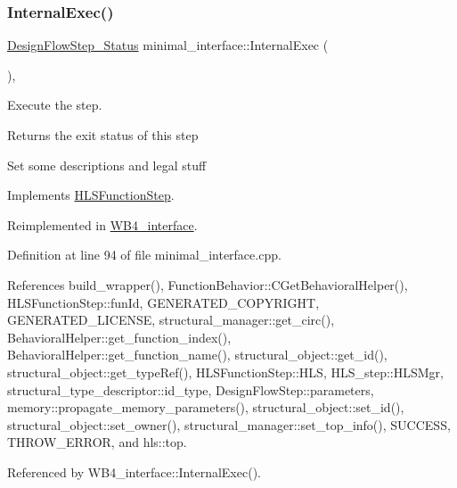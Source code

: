 \subsubsection{\texorpdfstring{Internal\+Exec()}{InternalExec()}}
{\footnotesize\ttfamily \hyperlink{design__flow__step_8hpp_afb1f0d73069c26076b8d31dbc8ebecdf}{Design\+Flow\+Step\+\_\+\+Status} minimal\+\_\+interface\+::\+Internal\+Exec (\begin{DoxyParamCaption}{ }\end{DoxyParamCaption})\hspace{0.3cm}{\ttfamily [override]}, {\ttfamily [virtual]}}



Execute the step. 

\begin{DoxyReturn}{Returns}
the exit status of this step 
\end{DoxyReturn}
Set some descriptions and legal stuff 

Implements \hyperlink{classHLSFunctionStep_a8db4c00d080655984d98143206fc9fa8}{H\+L\+S\+Function\+Step}.



Reimplemented in \hyperlink{classWB4__interface_ad041a3291160ebf2a0c852ac9ff70a5e}{W\+B4\+\_\+interface}.



Definition at line 94 of file minimal\+\_\+interface.\+cpp.



References build\+\_\+wrapper(), Function\+Behavior\+::\+C\+Get\+Behavioral\+Helper(), H\+L\+S\+Function\+Step\+::fun\+Id, G\+E\+N\+E\+R\+A\+T\+E\+D\+\_\+\+C\+O\+P\+Y\+R\+I\+G\+HT, G\+E\+N\+E\+R\+A\+T\+E\+D\+\_\+\+L\+I\+C\+E\+N\+SE, structural\+\_\+manager\+::get\+\_\+circ(), Behavioral\+Helper\+::get\+\_\+function\+\_\+index(), Behavioral\+Helper\+::get\+\_\+function\+\_\+name(), structural\+\_\+object\+::get\+\_\+id(), structural\+\_\+object\+::get\+\_\+type\+Ref(), H\+L\+S\+Function\+Step\+::\+H\+LS, H\+L\+S\+\_\+step\+::\+H\+L\+S\+Mgr, structural\+\_\+type\+\_\+descriptor\+::id\+\_\+type, Design\+Flow\+Step\+::parameters, memory\+::propagate\+\_\+memory\+\_\+parameters(), structural\+\_\+object\+::set\+\_\+id(), structural\+\_\+object\+::set\+\_\+owner(), structural\+\_\+manager\+::set\+\_\+top\+\_\+info(), S\+U\+C\+C\+E\+SS, T\+H\+R\+O\+W\+\_\+\+E\+R\+R\+OR, and hls\+::top.



Referenced by W\+B4\+\_\+interface\+::\+Internal\+Exec().

